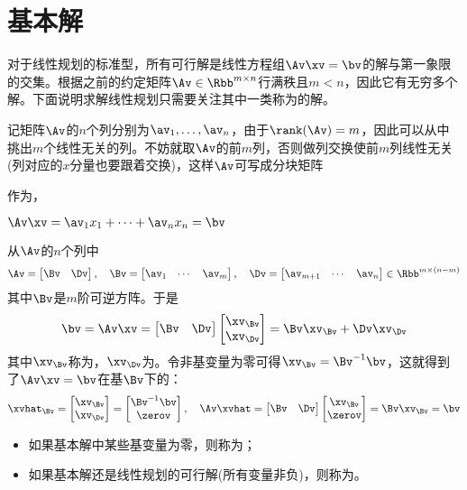 \documentclass{ctexart}
\begin{document}
\section{基本解}

对于线性规划的标准型，所有可行解是线性方程组$\Av \xv = \bv$的解与第一象限的交集。根据之前的约定矩阵$\Av \in \Rbb^{m \times n}$行满秩且$m < n$，因此它有无穷多个解。下面说明求解线性规划只需要关注其中一类称为的解。

记矩阵$\Av$的$n$个列分别为$\av_1, \ldots, \av_n$，由于$\rank(\Av) = m$，因此可以从中挑出$m$个线性无关的列。不妨就取$\Av$的前$m$列，否则做列交换使前$m$列线性无关(列对应的$x$分量也要跟着交换)，这样$\Av$可写成分块矩阵

作为，

$\Av \xv = \av_1 x_1 + \cdots + \av_n x_n = \bv$

从$\Av$的$n$个列中
\begin{align*}
    \Av = \begin{bmatrix} \Bv & \Dv \end{bmatrix}, \quad \Bv =
    \begin{bmatrix}
        \av_1 & \cdots & \av_m
    \end{bmatrix}, \quad \Dv =
    \begin{bmatrix}
        \av_{m+1} & \cdots & \av_n
    \end{bmatrix} \in \Rbb^{m \times (n-m)}
\end{align*}
其中$\Bv$是$m$阶可逆方阵。于是
\begin{align*}
    \bv = \Av \xv = \begin{bmatrix} \Bv & \Dv \end{bmatrix}
    \begin{bmatrix} \xv_\Bv \\ \xv_\Dv \end{bmatrix} = \Bv \xv_\Bv + \Dv \xv_\Dv
\end{align*}
其中$\xv_\Bv$称为，$\xv_\Dv$为。令非基变量为零可得$\xv_\Bv = \Bv^{-1} \bv$，这就得到了$\Av \xv = \bv$在基$\Bv$下的：
\begin{align*}
    \xvhat_\Bv = \begin{bmatrix} \xv_\Bv \\ \xv_\Dv \end{bmatrix} = \begin{bmatrix} \Bv^{-1} \bv \\ \zerov \end{bmatrix}, \quad \Av \xvhat = \begin{bmatrix} \Bv & \Dv \end{bmatrix} \begin{bmatrix} \xv_\Bv \\ \zerov \end{bmatrix} = \Bv \xv_\Bv = \bv
\end{align*}
\begin{itemize}
    \item 如果基本解中某些基变量为零，则称为；
    \item 如果基本解还是线性规划的可行解(所有变量非负)，则称为。
\end{itemize}
\end{document}
